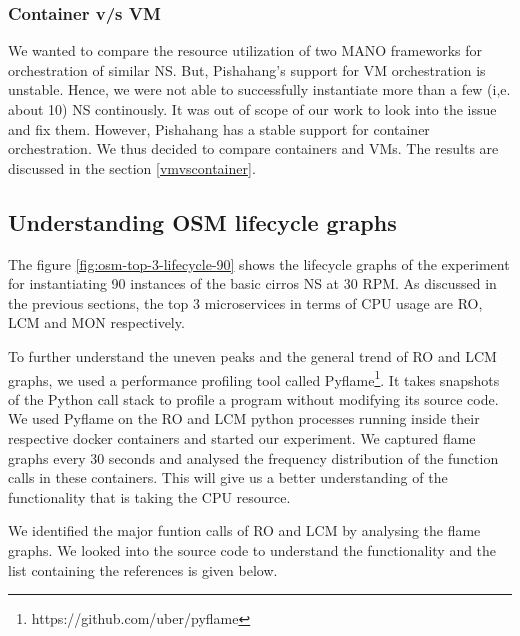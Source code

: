 \subsubsection{Container v/s VM}

We wanted to compare the resource utilization of two MANO frameworks for orchestration of similar NS. But, Pishahang's support for VM orchestration is unstable. Hence, we were not able to successfully instantiate more than a few (i,e. about 10) NS continously. It was out of scope of our work to look into the issue and fix them. However, Pishahang has a stable support for container orchestration. We thus decided to compare containers and VMs. The results are discussed in the section \ref{vmvscontainer}.
	
\subsection{Understanding OSM lifecycle graphs}

The figure \ref{fig:osm-top-3-lifecycle-90} shows the lifecycle graphs of the experiment for instantiating 90 instances of the basic cirros NS at 30 RPM. As discussed in the previous sections, the top 3 microservices in terms of CPU usage are RO, LCM and MON respectively. 

To further understand the uneven peaks and the general trend of RO and LCM graphs, we used a performance profiling tool called Pyflame\footnote{https://github.com/uber/pyflame}. It takes snapshots of the Python call stack to profile a program without modifying its source code. We used Pyflame on the RO and LCM python processes running inside their respective docker containers and started our experiment. We captured flame graphs every 30 seconds and analysed the frequency distribution of the function calls in these containers. This will give us a better understanding of the functionality that is taking the CPU resource.

We identified the major funtion calls of RO and LCM by analysing the flame graphs. We looked into the source code to understand the functionality and the list containing the references is given below.

